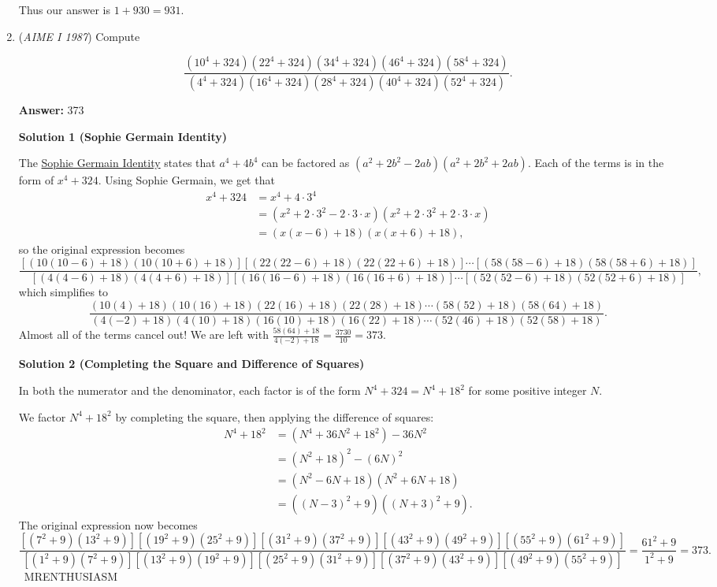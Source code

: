 \begin{enumerate}
 Thus our answer is $1+930=\boxed{931}$.

 


	\item (\textit{AIME I 1987}) Compute

 \[\frac{(10^4+324)(22^4+324)(34^4+324)(46^4+324)(58^4+324)}{(4^4+324)(16^4+324)(28^4+324)(40^4+324)(52^4+324)}.\]

 \textbf{Answer: }373



\textbf{Solution 1 (Sophie Germain Identity)}

The \href{https://artofproblemsolving.com/wiki/index.php?title=Sophie\_Germain\_Identity}{Sophie Germain Identity} states that $a^4 + 4b^4$ can be factored as $\left(a^2 + 2b^2 - 2ab\right)\left(a^2 + 2b^2 + 2ab\right).$ Each of the terms is in the form of $x^4 + 324.$ Using Sophie Germain, we get that
 \begin{align*} x^4 + 324 &= x^4 + 4\cdot 3^4 \\ &= \left(x^2 + 2 \cdot 3^2 - 2\cdot 3\cdot x\right)\left(x^2 + 2 \cdot 3^2 + 2\cdot 3\cdot x\right) \\ &= (x(x-6) + 18)(x(x+6)+18), \end{align*}
so the original expression becomes
 \[\frac{[(10(10-6)+18)(10(10+6)+18)][(22(22-6)+18)(22(22+6)+18)]\cdots[(58(58-6)+18)(58(58+6)+18)]}{[(4(4-6)+18)(4(4+6)+18)][(16(16-6)+18)(16(16+6)+18)]\cdots[(52(52-6)+18)(52(52+6)+18)]},\] which simplifies to 
 \[\frac{(10(4)+18)(10(16)+18)(22(16)+18)(22(28)+18)\cdots(58(52)+18)(58(64)+18)}{(4(-2)+18)(4(10)+18)(16(10)+18)(16(22)+18)\cdots(52(46)+18)(52(58)+18)}.\]Almost all of the terms cancel out! We are left with $\frac{58(64)+18}{4(-2)+18} = \frac{3730}{10} = \boxed{373}.$




\textbf{Solution 2 (Completing the Square and Difference of Squares)}

In both the numerator and the denominator, each factor is of the form $N^4+324=N^4+18^2$ for some positive integer $N.$ 

 We factor $N^4+18^2$ by completing the square, then applying the difference of squares:
 \begin{align*} N^4+18^2&=\left(N^4+36N^2+18^2\right)-36N^2 \\ &=\left(N^2+18\right)^2-(6N)^2 \\ &=\left(N^2-6N+18\right)\left(N^2+6N+18\right) \\ &=\left((N-3)^2+9\right)\left((N+3)^2+9\right). \end{align*}
The original expression now becomes 
 \[\frac{\left[(7^2+9)(13^2+9)\right]\left[(19^2+9)(25^2+9)\right]\left[(31^2+9)(37^2+9)\right]\left[(43^2+9)(49^2+9)\right]\left[(55^2+9)(61^2+9)\right]}{\left[(1^2+9)(7^2+9)\right]\left[(13^2+9)(19^2+9)\right]\left[(25^2+9)(31^2+9)\right]\left[(37^2+9)(43^2+9)\right]\left[(49^2+9)(55^2+9)\right]}=\frac{61^2+9}{1^2+9}=\boxed{373}.\]~MRENTHUSIASM


\end{enumerate}
